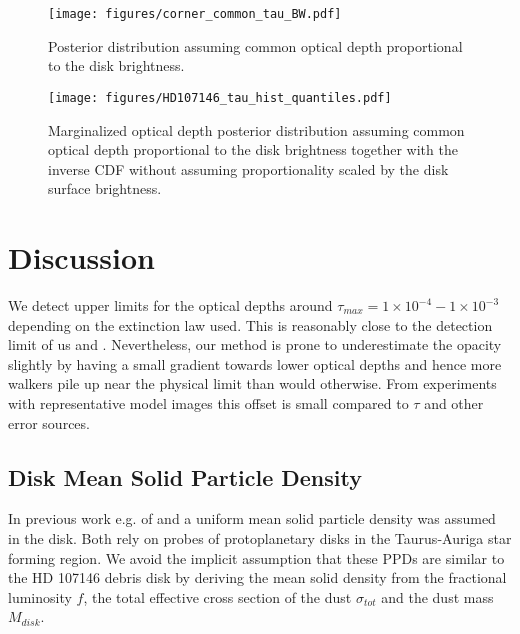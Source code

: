 \documentclass{aa}
\begin{document}
\begin{figure*}[ht]
	\centering
	\texttt{[image: figures/corner\_common\_tau\_BW.pdf]}
	\caption{Posterior distribution assuming common optical depth proportional to the disk brightness. }
	\label{fig:full_corner_common_tau}
\end{figure*}

\begin{figure}[ht]
	\centering
	\texttt{[image: figures/HD107146\_tau\_hist\_quantiles.pdf]}
	\caption{Marginalized optical depth posterior distribution assuming common optical depth proportional to the disk brightness together with the inverse CDF without assuming proportionality scaled by the disk surface brightness.}
	\label{fig:actual_hist}
\end{figure}

\section{Discussion}
\label{sec:discussion}

We detect upper limits for the optical depths around $\tau_{max} = 1\times 10^{-4} - 1\times 10^{-3}$ depending on the extinction law used. This is reasonably close to the detection limit of us and \cite{schneider2016extinction}. 
Nevertheless, our method is prone to underestimate the opacity slightly by having a small gradient towards lower optical depths and hence more walkers pile up near the physical limit than would otherwise. From experiments with representative model images this offset is small compared to $\tau$ and other error sources.


\subsection{Disk Mean Solid Particle Density}
\label{sec:dis_disk_density}

In previous work e.g. of \cite{ricci2015alma} and \cite{vanSluijs2018feasibility} a uniform mean solid particle density was assumed in the disk. Both rely on probes of protoplanetary disks in the Taurus-Auriga star forming region. We avoid the implicit assumption that these PPDs are similar to the HD 107146 debris disk by deriving the mean solid density from the fractional luminosity $f$, the total effective cross section of the dust $\sigma_{tot}$ and the dust mass $M_{disk}$.
\end{document}
